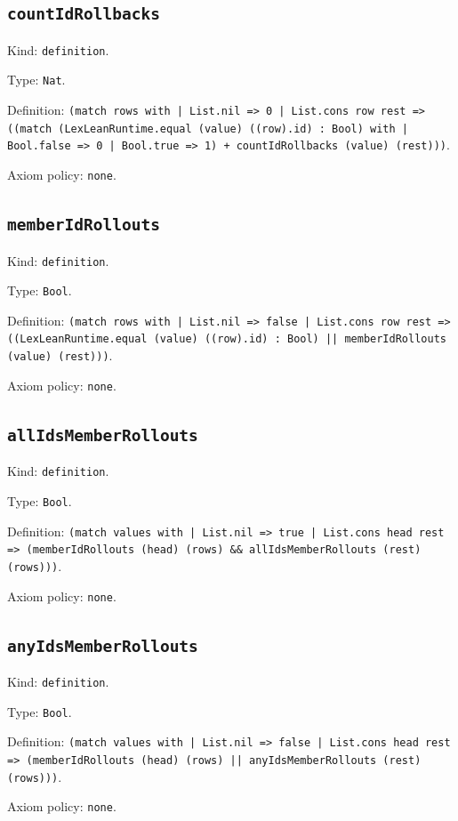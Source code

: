 \documentclass[11pt]{article}
\begin{document}
\subsection*{\texttt{countIdRollbacks}}
\noindent Kind: \texttt{definition}.\par
\noindent Type: \texttt{Nat}.\par
\noindent Definition: \texttt{(match rows with | List.nil => 0 | List.cons row rest => ((match (LexLeanRuntime.equal (value) ((row).id) : Bool) with | Bool.false => 0 | Bool.true => 1) + countIdRollbacks (value) (rest)))}.\par
\noindent Axiom policy: \texttt{none}.\par
\subsection*{\texttt{memberIdRollouts}}
\noindent Kind: \texttt{definition}.\par
\noindent Type: \texttt{Bool}.\par
\noindent Definition: \texttt{(match rows with | List.nil => false | List.cons row rest => ((LexLeanRuntime.equal (value) ((row).id) : Bool) || memberIdRollouts (value) (rest)))}.\par
\noindent Axiom policy: \texttt{none}.\par
\subsection*{\texttt{allIdsMemberRollouts}}
\noindent Kind: \texttt{definition}.\par
\noindent Type: \texttt{Bool}.\par
\noindent Definition: \texttt{(match values with | List.nil => true | List.cons head rest => (memberIdRollouts (head) (rows) \&\& allIdsMemberRollouts (rest) (rows)))}.\par
\noindent Axiom policy: \texttt{none}.\par
\subsection*{\texttt{anyIdsMemberRollouts}}
\noindent Kind: \texttt{definition}.\par
\noindent Type: \texttt{Bool}.\par
\noindent Definition: \texttt{(match values with | List.nil => false | List.cons head rest => (memberIdRollouts (head) (rows) || anyIdsMemberRollouts (rest) (rows)))}.\par
\noindent Axiom policy: \texttt{none}.\par
\end{document}
